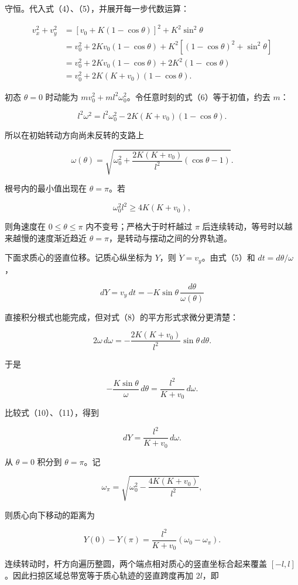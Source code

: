 \documentclass[12pt,a4paper,UTF8]{ctexart}
\begin{document}
守恒。代入式（4）、（5），并展开每一步代数运算：

\[
\begin{aligned}
v_x^2+v_y^2
&=[v_0+K(1-\cos\theta)]^2+K^2\sin^2\theta\\
&=v_0^2+2Kv_0(1-\cos\theta)
  +K^2[(1-\cos\theta)^2+\sin^2\theta]\\
&=v_0^2+2Kv_0(1-\cos\theta)+2K^2(1-\cos\theta)\\
&=v_0^2+2K(K+v_0)(1-\cos\theta).
\end{aligned}
\tag{7}
\]

初态 \(\theta=0\) 时动能为
\(mv_0^2+ml^2\omega_0^2\)。令任意时刻的式（6）等于初值，约去 \(m\)：

\[
l^2\omega^2
=l^2\omega_0^2-2K(K+v_0)(1-\cos\theta).
\]

所以在初始转动方向尚未反转的支路上

\[
\boxed{
\omega(\theta)=
\sqrt{
\omega_0^2+
\frac{2K(K+v_0)}{l^2}(\cos\theta-1)
}
}.
\tag{8}
\]

根号内的最小值出现在 \(\theta=\pi\)。若

\[
\omega_0^2l^2\ge4K(K+v_0),
\tag{9}
\]

则角速度在 \(0\le\theta\le\pi\) 内不变号；严格大于时杆越过 \(\pi\)
后连续转动，等号时以越来越慢的速度渐近趋近
\(\theta=\pi\)，是转动与摆动之间的分界轨道。

下面求质心的竖直位移。记质心纵坐标为 \(Y\)，则
\(\dot Y=v_y\)。由式（5）和 \(dt=d\theta/\omega\)，

\[
dY=v_y\,dt
=-K\sin\theta\,\frac{d\theta}{\omega(\theta)}
\tag{10}
\]

直接积分根式也能完成，但对式（8）的平方形式求微分更清楚：

\[
2\omega\,d\omega
=-\frac{2K(K+v_0)}{l^2}\sin\theta\,d\theta.
\]

于是

\[
-\frac{K\sin\theta}{\omega}\,d\theta
=\frac{l^2}{K+v_0}\,d\omega.
\tag{11}
\]

比较式（10）、（11），得到

\[
dY=\frac{l^2}{K+v_0}\,d\omega.
\tag{12}
\]

从 \(\theta=0\) 积分到 \(\theta=\pi\)。记

\[
\omega_\pi
=\sqrt{\omega_0^2-\frac{4K(K+v_0)}{l^2}},
\]

则质心向下移动的距离为

\[
Y(0)-Y(\pi)
=\frac{l^2}{K+v_0}(\omega_0-\omega_\pi).
\tag{13}
\]

连续转动时，杆方向遍历整圆，两个端点相对质心的竖直坐标合起来覆盖
\([-l,l]\)。因此扫掠区域总带宽等于质心轨迹的竖直跨度再加 \(2l\)，即
\end{document}
